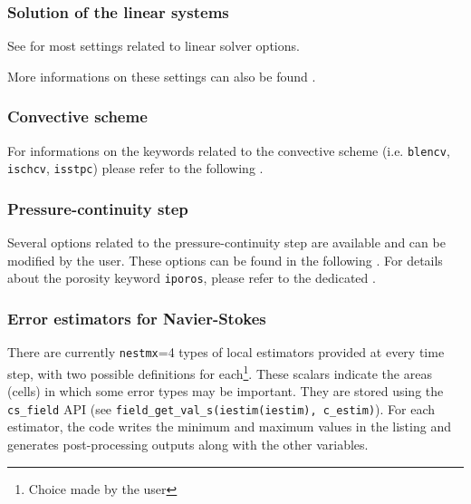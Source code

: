 \subsubsection{Solution of the linear systems}

See 
for most settings related to linear solver options.

More informations on these settings can also be found
.

\subsubsection{Convective scheme}

For informations on the keywords related to the convective scheme
(i.e. \texttt{blencv}, \texttt{ischcv}, \texttt{isstpc}) please
refer to the following .

\subsubsection{Pressure-continuity step}

Several options related to the pressure-continuity step
are available and can be modified by the user. These options
can be found in the following
.
For details about the porosity keyword \texttt{iporos}, please refer to
the dedicated .

\subsubsection{Error estimators for Navier-Stokes}

There are currently {\tt nestmx}=4 types of local estimators
provided at every time step, with two possible definitions for
each\footnote{Choice made by the user}. These scalars indicate the areas
(cells) in which some error types may be important. They are
stored using the \texttt{cs\_field} API (see
\texttt{field\_get\_val\_s(iestim(iestim), c\_estim)}).
For each estimator, the code writes the minimum and maximum values
in the listing and generates post-processing outputs along with
the other variables.

